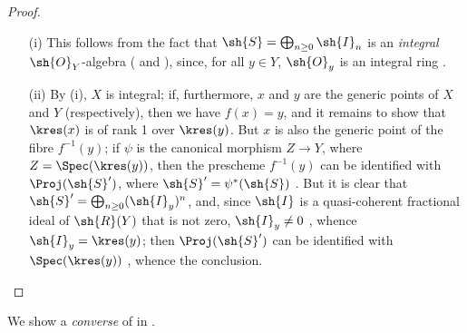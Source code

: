 \begin{proof}
\medskip\noindent
\begin{enumerate}
    \item[\rm{(i)}] This follows from the fact that $\sh{S} = \bigoplus_{n\geq0}\sh{I}_n$ is an \emph{integral} $\sh{O}_Y$-algebra ( and ), since, for all $y\in Y$, $\sh{O}_y$ is an integral ring .
    \item[\rm{(ii)}] By (i), $X$ is integral;
        if, furthermore, $x$ and $y$ are the generic points of $X$ and $Y$ (respectively), then we have $f(x) = y$, and it remains to show that $\kres(x)$ is of rank 1 over $\kres(y)$.
        But $x$ is also the generic point of the fibre $f^{-1}(y)$;
        if $\psi$ is the canonical morphism $Z\to Y$, where $Z=\Spec(\kres(y))$, then the prescheme $f^{-1}(y)$ can be identified with $\Proj(\sh{S}')$, where $\sh{S}' = \psi^*(\sh{S})$ .
        But it is clear that $\sh{S}' = \bigoplus_{n\geq0}(\sh{I}_y)^n$, and, since $\sh{I}$ is a quasi-coherent fractional ideal of $\sh{R}(Y)$ that is not zero, $\sh{I}_y \neq 0$ , whence $\sh{I}_y = \kres(y)$;
        then $\Proj(\sh{S}')$ can be identified with $\Spec(\kres(y))$ , whence the conclusion.
\end{enumerate}
\end{proof}

We show a \emph{converse} of  in .

